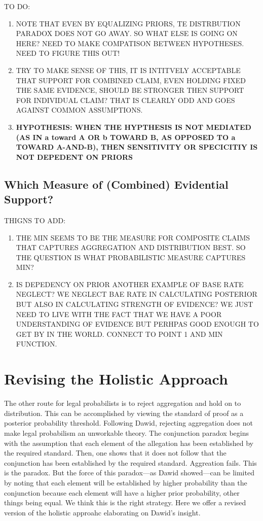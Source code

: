 \documentclass[10pt,dvipsnames,enabledeprecatedfontcommands]{scrartcl}
\begin{document}
TO DO:

\begin{enumerate}
\def\labelenumi{\arabic{enumi}.}
\item
  NOTE THAT EVEN BY EQUALIZING PRIORS, TE DISTRBUTION PARADOX DOES NOT
  GO AWAY. SO WHAT ELSE IS GOING ON HERE? NEED TO MAKE COMPATISON
  BETWEEN HYPOTHESES. NEED TO FIGURE THIS OUT!
\item
  TRY TO MAKE SENSE OF THIS, IT IS INTITVELY ACCEPTABLE THAT SUPPORT FOR
  COMBINED CLAIM, EVEN HOLDING FIXED THE SAME EVIDENCE, SHOULD BE
  STRONGER THEN SUPPORT FOR INDIVIDUAL CLAIM? THAT IS CLEARLY ODD AND
  GOES AGAINST COMMON ASSUMPTIONS.
\item
  \textbf{HYPOTHESIS: WHEN THE HYPTHESIS IS NOT MEDIATED (AS IN a toward A OR b TOWARD B, AS OPPOSED TO a TOWARD A-AND-B), THEN SENSITIVITY OR SPECICITIY IS NOT DEPEDENT ON PRIORS}
\end{enumerate}

\subsection{Which Measure of (Combined) Evidential
Support?}\label{which-measure-of-combined-evidential-support}

THIGNS TO ADD:

\begin{enumerate}
\def\labelenumi{\arabic{enumi}.}
\item
  THE MIN SEEMS TO BE THE MEASURE FOR COMPOSITE CLAIMS THAT CAPTURES
  AGGREGATION AND DISTRIBUTION BEST. SO THE QUESTION IS WHAT
  PROBABILISTIC MEASURE CAPTURES MIN?
\item
  IS DEPEDENCY ON PRIOR ANOTHER EXAMPLE OF BASE RATE NEGLECT? WE NEGLECT
  BAE RATE IN CALCULATING POSTERIOR BUT ALSO IN CALCULATING STRENGTH OF
  EVIDENCE? WE JUST NEED TO LIVE WITH THE FACT THAT WE HAVE A POOR
  UNDERSTANDING OF EVIDENCE BUT PERHPAS GOOD ENOUGH TO GET BY IN THE
  WORLD. CONNECT TO POINT 1 AND MIN FUNCTION.
\end{enumerate}

\section{Revising the Holistic
Approach}\label{revising-the-holistic-approach}

The other route for legal probabilists is to reject aggregation and hold
on to distribution. This can be accomplished by viewing the standard of
proof as a posterior probability threshold. Following Dawid, rejecting
aggregation does not make legal probabilism an unworkable theory. The
conjunction paradox begins with the assumption that each element of the
allegation has been established by the required standard. Then, one
shows that it does not follow that the conjunction has been established
by the required standard. Aggreation fails. This is the paradox. But the
force of this paradox---as Dawid showed---can be limited by noting that
each element will be established by higher probability than the
conjunction because each element will have a higher prior probability,
other things being equal. We think this is the right strategy. Here we
offer a revised version of the holistic approahc elaborating on Dawid's
insight.
\end{document}
